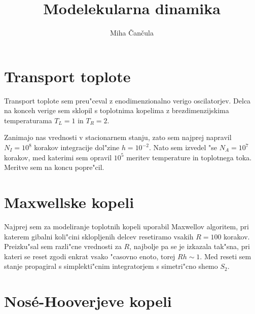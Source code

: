 \documentclass[a4paper,10pt]{article}
\title{Modelekularna dinamika}
\author{Miha \v Can\v cula}
\begin{document}
\maketitle

\section{Transport toplote}

Transport toplote sem preu"ceval z enodimenzionalno verigo oscilatorjev. 
Delca na konceh verige sem sklopil s toplotnima kopelima z brezdimenzijskima temperaturama $T_L=1$ in $T_R=2$. 

Zanimajo nas vrednosti v stacionarnem stanju, zato sem najprej napravil $N_I = 10^{8}$ korakov integracije dol"zine $h=10^{-2}$. 
Nato sem izvedel "se $N_A=10^{7}$ korakov, med katerimi sem opravil $10^{5}$ meritev temperature in toplotnega toka. 
Meritve sem na koncu popre"cil. 

\section{Maxwellske kopeli}

Najprej sem za modeliranje toplotnih kopeli uporabil Maxwellov algoritem, pri katerem gibalni koli"cini sklopljenih delcev resetiramo vsakih $R=100$ korakov. 
Preizku"sal sem razli"cne vrednosti za $R$, najbolje pa se je izkazala tak"sna, pri kateri se reset zgodi enkrat vsako "casovno enoto, torej $Rh \sim 1$. 
Med reseti sem stanje propagiral s simplekti"cnim integratorjem s simetri"cno shemo $S_2$. 









\section{Nos\'e-Hooverjeve kopeli}
\end{document}
